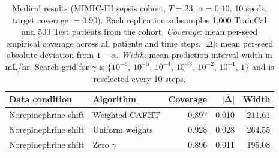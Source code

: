 \begin{table}[ht]
\centering
\small
\setlength{\tabcolsep}{8pt}
\renewcommand{\arraystretch}{1.15}
\caption{%
  Medical results (MIMIC-III sepsis cohort, $T=23$, $\alpha=0.10$, 10 seeds,
  target coverage $= 0.90$).
  Each replication subsamples 1{,}000 TrainCal and 500 Test patients from
  the cohort.
  \textit{Coverage}: mean per-seed empirical coverage across all patients
  and time steps.
  $\overline{|\Delta|}$: mean per-seed absolute deviation from $1-\alpha$.
  \textit{Width}: mean prediction interval width in mL/hr.
  Search grid for $\gamma$ is
  $\{10^{-6},\, 10^{-5},\, 10^{-4},\, 10^{-3},\, 10^{-2},\, 10^{-1},\, 1\}$
  and is reselected every 10 steps.
}
\label{tab:medical}
\begin{tabular}{@{} llrrr @{}}
\toprule
{\bfseries Data condition} & {\bfseries Algorithm}
  & {\bfseries Coverage} & $\boldsymbol{\overline{|\Delta|}}$ & {\bfseries Width} \\
\midrule
Norepinephrine shift
  & Weighted CAFHT      & 0.897 & 0.010 & 211.61 \\
Norepinephrine shift
  & Uniform weights     & 0.928 & 0.028 & 264.55 \\
Norepinephrine shift
  & Zero $\gamma$       & 0.896 & 0.011 & 195.08 \\
\bottomrule
\end{tabular}
\end{table}
